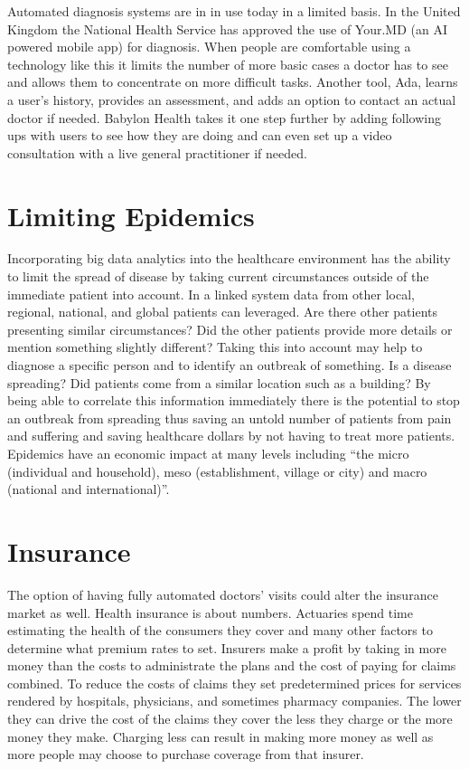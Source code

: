 \documentclass[sigconf]{acmart}
\begin{document}
Automated diagnosis systems are in in use today in a limited basis.  In the 
United Kingdom the National Health Service has approved the use of Your.MD 
(an AI powered mobile app) for diagnosis.  When people are comfortable 
using a technology like this it limits the number of more basic cases a 
doctor has to see and allows them to concentrate on more difficult tasks.  
Another tool, Ada, learns a user's history, provides an assessment, and adds 
an option to contact an actual doctor if needed.  Babylon Health takes it 
one step further by adding following ups with users to see how they are 
doing and can even set up a video consultation with a live general 
practitioner if needed\cite{NextWeb}. 

\section{Limiting Epidemics}
Incorporating big data analytics into the healthcare environment has the 
ability to limit the spread of disease by taking current circumstances 
outside of the immediate patient into account.  In a linked system data 
from other local, regional, national, and global patients can leveraged.  
Are there other patients presenting similar circumstances?  Did the other 
patients provide more details or mention something slightly different?  
Taking this into account may help to diagnose a specific person and to 
identify an outbreak of something.  Is a disease spreading?  Did patients 
come from a similar location such as a building?  By being able to 
correlate this information immediately there is the potential to stop an 
outbreak from spreading thus saving an untold number of patients from 
pain and suffering and saving healthcare dollars by not having to treat 
more patients.  Epidemics have an economic impact at many levels 
including ``the micro (individual and household), meso (establishment, 
village or city) and macro (national and 
international)''\cite{WHOResponse}.

\section{Insurance}
The option of having fully automated doctors' visits could alter the 
insurance market as well.  Health insurance is about numbers.  Actuaries 
spend time estimating the health of the consumers they cover and many 
other factors to determine what premium rates to set\cite{Actuary}.  
Insurers make a profit by taking in more money than the costs to 
administrate the plans and the cost of paying for claims combined.  
To reduce the costs of claims they set predetermined prices for services 
rendered by hospitals, physicians, and sometimes pharmacy companies.  
The lower they can drive the cost of the claims they cover the less 
they charge or the more money they make.  Charging less can result in 
making more money as well as more people may choose to purchase 
coverage from that insurer.
\end{document}
